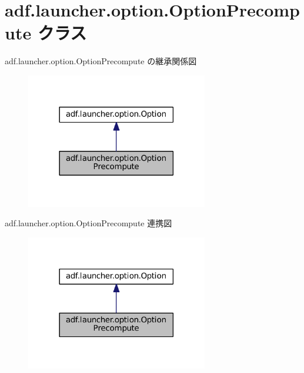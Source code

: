 \hypertarget{classadf_1_1launcher_1_1option_1_1OptionPrecompute}{}\section{adf.\+launcher.\+option.\+Option\+Precompute クラス}
\label{classadf_1_1launcher_1_1option_1_1OptionPrecompute}


adf.\+launcher.\+option.\+Option\+Precompute の継承関係図
\nopagebreak
\begin{figure}[H]
\begin{center}
\leavevmode
\includegraphics[width=225pt]{classadf_1_1launcher_1_1option_1_1OptionPrecompute__inherit__graph}
\end{center}
\end{figure}


adf.\+launcher.\+option.\+Option\+Precompute 連携図
\nopagebreak
\begin{figure}[H]
\begin{center}
\leavevmode
\includegraphics[width=225pt]{classadf_1_1launcher_1_1option_1_1OptionPrecompute__coll__graph}
\end{center}
\end{figure}

